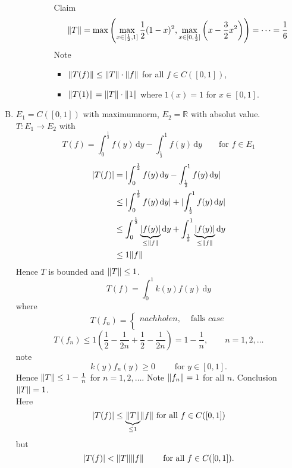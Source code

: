 \begin{beispiele}
\begin{enumerate}[(A)]
\begin{beweis}
\begin{enumerate}[(1)]
\begin{description}
\begin{align*}
				\end{align*}
				Claim 
				\[
					\norm{T} = \max \left( \max\limits_{x \in [\frac{1}{2},1]} \frac{1}{2}(1-x)^2 , \max\limits_{x \in [0,\frac{1}{2}]}\left( x - \frac{3}{2}x^2
					 \right) \right) = 
					\dots = \frac{1}{6}
				\]
				Note 
				\begin{itemize}
					\item $\norm{T(f)}\leq \norm{T} \cdot \norm{f}$ for all $f \in C([0,1])$,
					\item $\norm{T(1)} = \norm{T} \cdot \norm{1}$ where $1(x)=1$ for $x \in [0,1]$.
				\end{itemize}
			\end{description}
		\end{enumerate}
	\end{beweis}
	\item $E_1 = C([0,1])$ with maximumnorm, $E_2 = \mathbb{R}$ with absolut value. $T: E_1 \to E_2$ with
	\[
		T(f) = \int_{0}^{\frac{1}{2}}f(y) \,\mathrm{d}y - \int_{\frac{1}{2}}^{1} f(y) \,\mathrm{d}y \qquad \text{for }f \in E_1
	\]
	\begin{align*}
		\abs{T(f)} &= \abs{\int_{0}^{\frac{1}{2}}f(y) \,\mathrm{d}y - \int_{\frac{1}{2}}^{1} f(y) \,\mathrm{d}y} \\
		&\leq \abs{\int_{0}^{\frac{1}{2}}f(y) \,\mathrm{d}y} + \abs{\int_{\frac{1}{2}}^{1} f(y) \,\mathrm{d}y} \\
		&\leq \int_{0}^{\frac{1}{2}}\underset{\leq \norm{f}}{\underbrace{\abs{f(y)}}} \,\mathrm{d}y 
		+ \int_{\frac{1}{2}}^{1} \underset{\leq \norm{f}}{\underbrace{\abs{f(y)}}} \,\mathrm{d}y \\
		&\leq 1 \norm{f}
	\end{align*}
	Hence $T$ is bounded and $\norm{T}\leq 1$.
	\[
		T(f) = \int_{0}^{1}k(y)f(y) \,\mathrm{d}y 
	\]
	where 
	\[
		T(f_n)= \begin{cases}
			nachholen, &\text{ falls }case\\
			
		\end{cases}
	\]
	\[
		T(f_n) \leq 1 \left( \frac{1}{2} - \frac{1}{2n} + \frac{1}{2} - \frac{1}{2n} \right) = 1 - \frac{1}{n}, \qquad  n=1,2,\dots
	\]
	note
	\[
		k(y)f_n(y) \geq 0 \qquad \text{ for } y \in [0,1].
	\]
	Hence $\norm{T} \leq 1- \frac{1}{n}$ for $n =1,2,\dots$. Note $\norm{f_n}=1$ for all $n$. Conclusion $\norm{T}=1$. \\
	Here
	\[
		\abs{T(f)} \leq \underset{\leq 1}{\underbrace{\norm{T}}} \norm{f} \text{ for all }f \in C([0,1])
	\]
	but
	\[
		\abs{T(f)} < \norm{T} \norm{f} \qquad \text{ for all }f \in C([0,1]).
	\]
	\end{enumerate}
\end{beispiele}
